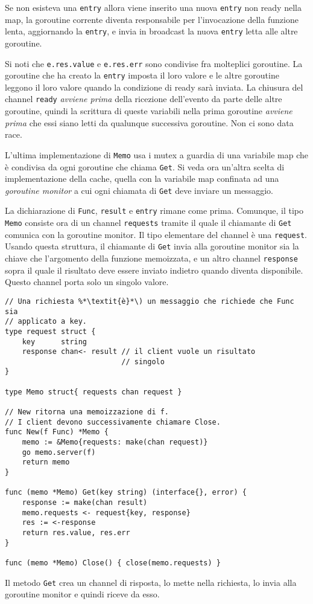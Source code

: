 Se non esisteva una \verb|entry| allora viene inserito una nuova \verb|entry| non ready nella map, la goroutine corrente diventa responsabile per l'invocazione della funzione lenta, aggiornando la \verb|entry|, e invia in broadcast la nuova \verb|entry| letta alle altre goroutine.

Si noti che \verb|e.res.value| e \verb|e.res.err| sono condivise fra molteplici goroutine.
La goroutine che ha creato la \verb|entry| imposta il loro valore e le altre goroutine leggono il loro valore quando la condizione di ready sarà inviata.
La chiusura del channel \verb|ready| \textit{avviene prima} della ricezione dell'evento da parte delle altre goroutine, quindi la scrittura di queste variabili nella prima goroutine \textit{avviene prima} che essi siano letti da qualunque successiva goroutine.
Non ci sono data race.

L'ultima implementazione di \verb|Memo| usa i mutex a guardia di una variabile map che è condivisa da ogni goroutine che chiama \verb|Get|.
Si veda ora un'altra scelta di implementazione della cache, quella con la variabile map confinata ad una \textit{goroutine monitor} a cui ogni chiamata di \verb|Get| deve inviare un messaggio.

La dichiarazione di \verb|Func|, \verb|result| e \verb|entry| rimane come prima.
Comunque, il tipo \verb|Memo| consiste ora di un channel \verb|requests| tramite il quale il chiamante di \verb|Get| comunica con la goroutine monitor.
Il tipo elementare del channel è una \verb|request|.
Usando questa struttura, il chiamante di \verb|Get| invia alla goroutine monitor sia la chiave che l'argomento della funzione memoizzata, e un altro channel \verb|response| sopra il quale il risultato deve essere inviato indietro quando diventa disponibile.
Questo channel porta solo un singolo valore.
\begin{lstlisting}[frame=single, label={lst:lstlisting9-7.10}]
// Una richiesta %*\textit{è}*\) un messaggio che richiede che Func sia
// applicato a key.
type request struct {
    key      string
    response chan<- result // il client vuole un risultato
                           // singolo
}

type Memo struct{ requests chan request }

// New ritorna una memoizzazione di f.
// I client devono successivamente chiamare Close.
func New(f Func) *Memo {
    memo := &Memo{requests: make(chan request)}
    go memo.server(f)
    return memo
}

func (memo *Memo) Get(key string) (interface{}, error) {
    response := make(chan result)
    memo.requests <- request{key, response}
    res := <-response
    return res.value, res.err
}

func (memo *Memo) Close() { close(memo.requests) }
\end{lstlisting}
Il metodo \verb|Get| crea un channel di risposta, lo mette nella richiesta, lo invia alla goroutine monitor e quindi riceve da esso.

